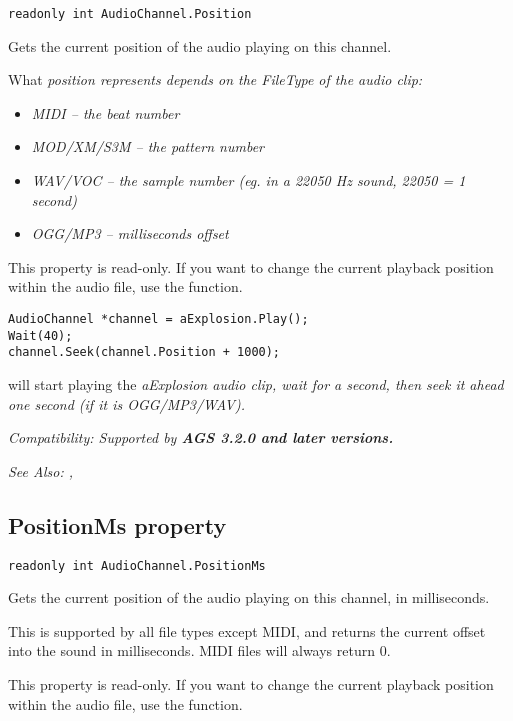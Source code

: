 \begin{verbatim}
readonly int AudioChannel.Position
\end{verbatim}
Gets the current position of the audio playing on this channel.

What \it{position} represents depends on the FileType of the audio clip:
\begin{itemize}
\item \it{MIDI} -- the beat number
\item \it{MOD/XM/S3M} -- the pattern number
\item \it{WAV/VOC} -- the sample number (eg. in a 22050 Hz sound, 22050 = 1 second)
\item \it{OGG/MP3} -- milliseconds offset
\end{itemize}

This property is read-only. If you want to change the current playback position within the audio file,
use the  function.

\begin{verbatim}
AudioChannel *channel = aExplosion.Play();
Wait(40);
channel.Seek(channel.Position + 1000);
\end{verbatim}
will start playing the \it{aExplosion} audio clip, wait for a second, then seek it ahead one second (if it is OGG/MP3/WAV).

\it{Compatibility:} Supported by \bf{AGS 3.2.0} and later versions.

\it{See Also:} ,


\subsection{PositionMs property}\label{AudioChannel.PositionMs}%

\begin{verbatim}
readonly int AudioChannel.PositionMs
\end{verbatim}
Gets the current position of the audio playing on this channel, in milliseconds.

This is supported by all file types except MIDI, and returns the current offset into the sound
in milliseconds. MIDI files will always return 0.

This property is read-only. If you want to change the current playback position within the audio file,
use the  function.

